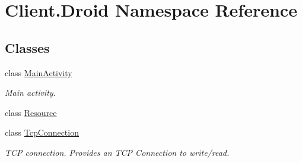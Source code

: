 \hypertarget{namespaceClient_1_1Droid}{}\section{Client.\+Droid Namespace Reference}
\label{namespaceClient_1_1Droid}
\subsection*{Classes}
\begin{DoxyCompactItemize}
\item 
class \hyperlink{classClient_1_1Droid_1_1MainActivity}{Main\+Activity}
\begin{DoxyCompactList}\small\item\em Main activity. \end{DoxyCompactList}\item 
class \hyperlink{classClient_1_1Droid_1_1Resource}{Resource}
\item 
class \hyperlink{classClient_1_1Droid_1_1TcpConnection}{Tcp\+Connection}
\begin{DoxyCompactList}\small\item\em T\+C\+P connection. Provides an T\+C\+P Connection to write/read. \end{DoxyCompactList}\end{DoxyCompactItemize}
